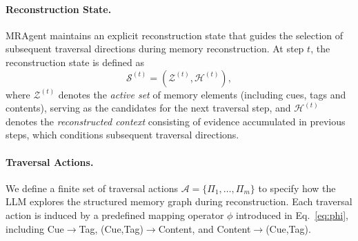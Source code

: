 \paragraph{Reconstruction State.} MRAgent maintains an explicit reconstruction state that guides the selection of
subsequent traversal directions during memory reconstruction.
At step $t$, the reconstruction state is defined as
\begin{equation}
\mathcal{S}^{(t)} = (\mathcal{Z}^{(t)}, \mathcal{H}^{(t)}),
\end{equation}
where $\mathcal{Z}^{(t)}$ denotes the \emph{active set} of memory elements (including cues, tags and contents), serving as the candidates for the next traversal step, and $\mathcal{H}^{(t)}$ denotes the \emph{reconstructed context} consisting of evidence accumulated in previous steps, which conditions subsequent traversal directions.

\paragraph{Traversal Actions.}
We define a finite set of traversal actions
$\mathcal{A}=\{\Pi_1,\ldots,\Pi_m\}$ to specify how the LLM explores the structured
memory graph during reconstruction.
Each traversal action is induced by a predefined mapping operator $\phi$
introduced in Eq.~\eqref{eq:phi}, including
Cue$\rightarrow$Tag, (Cue,Tag)$\rightarrow$Content, and Content$\rightarrow$(Cue,Tag).

